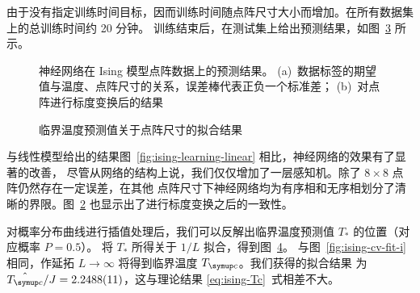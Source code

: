 由于没有指定训练时间目标，因而训练时间随点阵尺寸大小而增加。在所有数据集上的总训练时间约 20 分钟。
训练结束后，在测试集上给出预测结果，如图~\ref{fig:ising-learning-net-total} 所示。

\begin{figure}[htb]
  \centering
  \begin{subfigure}[b]{0.47\textwidth}
    \centering
    \label{fig:ising-learning-net}
  \end{subfigure}
  \begin{subfigure}[b]{0.47\textwidth}
    \centering
    \label{fig:ising-learning-net-scaled}
  \end{subfigure}
  \caption{神经网络在 Ising 模型点阵数据上的预测结果。
    (a)~数据标签的期望值与温度、点阵尺寸的关系，误差棒代表正负一个标准差；
    (b)~对点阵进行标度变换后的结果}
  \label{fig:ising-learning-net-total}
\end{figure}

\begin{figure}[htb]
  \centering
  \caption{临界温度预测值关于点阵尺寸的拟合结果}
  \label{fig:ising-learning-net-fit}
\end{figure}

与线性模型给出的结果图~\ref{fig:ising-learning-linear} 相比，神经网络的效果有了显著的改善，
尽管从网络的结构上说，我们仅仅增加了一层感知机。除了 $8 \times 8$ 点阵仍然存在一定误差，在其他
点阵尺寸下神经网络均为有序相和无序相划分了清晰的界限。图~\ref{fig:ising-learning-net-scaled}
也显示出了进行标度变换之后的一致性。

对概率分布曲线进行插值处理后，我们可以反解出临界温度预测值 $T_*$ 的位置（对应概率 $P=0.5$）。
\cite{phase} 将 $T_*$ 所得关于 $1/L$ 拟合，得到图~\ref{fig:ising-learning-net-fit}。
与图~\ref{fig:ising-cv-fit-i} 相同，作延拓 $L\to\infty$ 将得到临界温度 $\Tc$。我们获得的拟合结果
为 $\hat{\Tc}/J=\num{2.2488(11)}$，这与理论结果 \eqref{eq:ising-Tc}~式相差不大。
